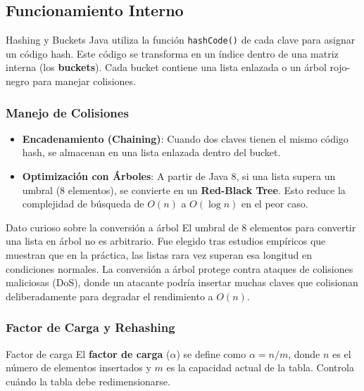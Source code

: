 \subsection{Funcionamiento Interno}
\label{subsec:funcionamiento-interno}

\begin{definicion}{Hashing y Buckets}
Java utiliza la función \texttt{hashCode()} de cada clave para asignar un código hash. Este código se transforma en un índice dentro de una matriz interna (los \textbf{buckets}). Cada bucket contiene una lista enlazada o un árbol rojo-negro para manejar colisiones.
\end{definicion}

\subsubsection{Manejo de Colisiones}
\begin{itemize}
    \item \textbf{Encadenamiento (Chaining)}: Cuando dos claves tienen el mismo código hash, se almacenan en una lista enlazada dentro del bucket.
    \item \textbf{Optimización con Árboles}: A partir de Java 8, si una lista supera un umbral (8 elementos), se convierte en un \textbf{Red-Black Tree}. Esto reduce la complejidad de búsqueda de \(O(n)\) a \(O(\log n)\) en el peor caso.
\end{itemize}

\begin{observacion}{Dato curioso sobre la conversión a árbol}
El umbral de 8 elementos para convertir una lista en árbol no es arbitrario. Fue elegido tras estudios empíricos que muestran que en la práctica, las listas rara vez superan esa longitud en condiciones normales. La conversión a árbol protege contra ataques de colisiones maliciosas (DoS), donde un atacante podría insertar muchas claves que colisionan deliberadamente para degradar el rendimiento a \(O(n)\).
\end{observacion}

\subsubsection{Factor de Carga y Rehashing}
\begin{definicion}{Factor de carga}
El \textbf{factor de carga} (\(\alpha\)) se define como \(\alpha = n / m\), donde \(n\) es el número de elementos insertados y \(m\) es la capacidad actual de la tabla. Controla cuándo la tabla debe redimensionarse.
\end{definicion}

